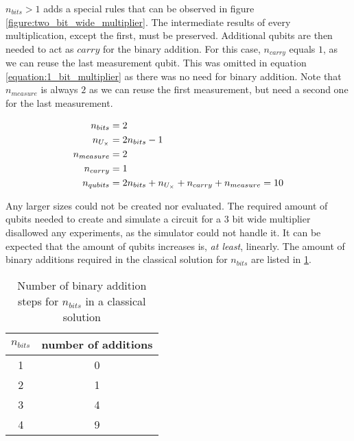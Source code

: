 $n_{bits} > 1$ adds a special rules that can be observed in figure \ref{figure:two_bit_wide_multiplier}. The intermediate results of every multiplication, except the first, must be preserved. Additional qubits are then needed to act as $carry$ for the binary addition. For this case, $n_{carry}$ equals $1$, as we can reuse the last measurement qubit. This was omitted in equation \ref{equation:1_bit_multiplier} as there was no need for binary addition. Note that $n_{measure}$ is always $2$ as we can reuse the first measurement, but need a second one for the last measurement.

\begin{equation}\label{equation:2_bit_multiplier}
\centering
    \begin{split}
        n_{bits} &= 2 \\
        n_{U_{\times}} &= 2n_{bits} -1 \\
        n_{measure} &= 2\\
        n_{carry} &= 1\\
        n_{qubits} &= 2n_{bits} + n_{U_{\times}} + n_{carry} + n_{measure} = 10
    \end{split}
\end{equation}

Any larger sizes could not be created nor evaluated. The required amount of qubits needed to create and simulate a circuit for a $3$ bit wide multiplier disallowed any experiments, as the  simulator could not handle it. It can be expected that the amount of qubits increases is, \emph{at least}, linearly. The amount of binary additions required in the classical solution for $n_{bits}$ are listed in \ref{table:amount_addition_binary_multiplication}.

\begin{table}[!h]
    \centering
    \begin{tabular}{|c|c|}
    \hline
    $n_{bits}$ & number of additions \\ \hline
    1          & 0                   \\ \hline
    2          & 1                   \\ \hline
    3          & 4                   \\ \hline
    4          & 9                   \\ \hline
    \end{tabular}
    \caption{Number of binary addition steps for $n_{bits}$ in a classical solution}
    \label{table:amount_addition_binary_multiplication}
\end{table}


